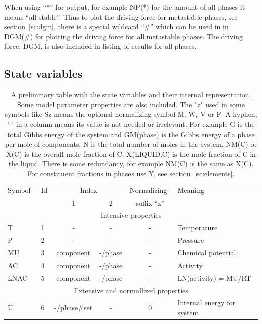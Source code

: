 \documentclass[11pt]{article}
\begin{document}
When using ``*'' for output, for example NP(*) for the amount of all
phases it means ``all stable''.  Thus to plot the driving force for
metastable phases, see section~\ref{sc:dgm}, there is a special
wildcard ``\#'' which can be used in in DGM(\#) for plotting the driving
force for all metastable phases.  The driving force, DGM, is also
included in listing of results for all phases.

\hypertarget{Info statevariables}{}
\subsection{State variables}\label{sc:statevar}

\begin{table}[!ht]
\caption{A preliminary table with the state variables and their
  internal representation.  Some model parameter properties are also
  included.  The "z" used in some symbols like Sz means the optional
  normalizing symbol M, W, V or F.  A hyphen, '-' in a column means
  its value is not needed or irrelevant.  For example G is the total
  Gibbs energy of the system and GM(phase) is the Gibbs energy of a
  phase per mole of components. N is the total number of moles in the
  system, NM(C) or X(C) is the overall mole fraction of C, X(LIQUID,C)
  is the mole fraction of C in the liquid.  There is some redundancy,
  for example NM(C) is the same as X(C).  For constituent fractions in
  phases use Y, see section~\ref{sc:elements}.}\label{tab:statev}
  {\small\begin{tabular}{|llcccl|}\hline
Symbol~ & Id & \multicolumn{2}{c}{Index}  & Normalizing~  & Meaning\\
        &    & 1 & 2                      &  suffix ``z'' & \\\hline
\multicolumn{6}{|c|}{Intensive properties}\\\hline
T      & 1  & -         & -               & - & Temperature\\
P      & 2  & -         & -               & - & Pressure\\
MU     & 3  & component & -/phase         & - & Chemical potential\\
AC     & 4  & component & -/phase         & - & Activity\\
LNAC   & 5  & component & -/phase         & - & LN(activity) = MU/RT\\\hline
\multicolumn{6}{|c|}{Extensive and normallized properties}\\\hline
U      & 6 & -/phase\#set & -         & 0 & Internal energy for system\\

\end{tabular}}
\end{table}
\end{document}
